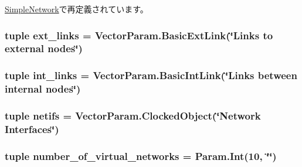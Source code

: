 \hyperlink{classSimpleNetwork_1_1SimpleNetwork_a17da7064bc5c518791f0c891eff05fda}{SimpleNetwork}で再定義されています。\hypertarget{classNetwork_1_1RubyNetwork_ac0d3207c2e6c5b337f986a3eea2fad55}{
\subsubsection[{ext\_\-links}]{\setlength{\rightskip}{0pt plus 5cm}tuple {\bf ext\_\-links} = VectorParam.BasicExtLink(\char`\"{}Links to external nodes\char`\"{})}}
\label{classNetwork_1_1RubyNetwork_ac0d3207c2e6c5b337f986a3eea2fad55}
\hypertarget{classNetwork_1_1RubyNetwork_a382a7133bdc70d16f01d876f743a7d2d}{
\subsubsection[{int\_\-links}]{\setlength{\rightskip}{0pt plus 5cm}tuple {\bf int\_\-links} = VectorParam.BasicIntLink(\char`\"{}Links between internal nodes\char`\"{})}}
\label{classNetwork_1_1RubyNetwork_a382a7133bdc70d16f01d876f743a7d2d}
\hypertarget{classNetwork_1_1RubyNetwork_a6affed49d5dbca8d315c82b3a02c588e}{
\subsubsection[{netifs}]{\setlength{\rightskip}{0pt plus 5cm}tuple {\bf netifs} = VectorParam.ClockedObject(\char`\"{}Network Interfaces\char`\"{})}}
\label{classNetwork_1_1RubyNetwork_a6affed49d5dbca8d315c82b3a02c588e}
\hypertarget{classNetwork_1_1RubyNetwork_a3a95fb4eb2b16f40b89c010572e72a54}{
\subsubsection[{number\_\-of\_\-virtual\_\-networks}]{\setlength{\rightskip}{0pt plus 5cm}tuple {\bf number\_\-of\_\-virtual\_\-networks} = Param.Int(10, \char`\"{}\char`\"{})}}
